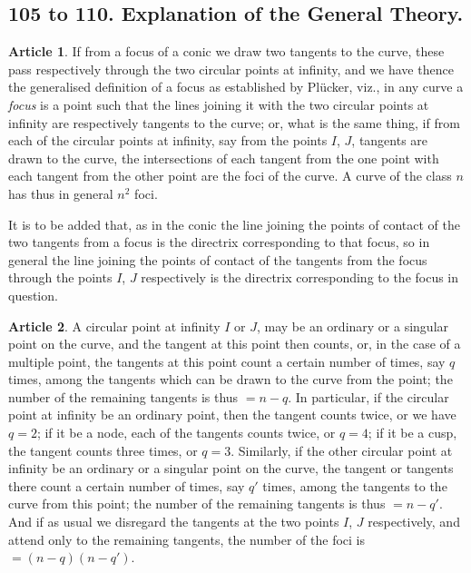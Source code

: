 \documentclass[11pt,a4paper]{article}
\theoremstyle{definition}
\newtheorem{art}{Article}
\begin{document}
\subsection*{105 to 110. Explanation of the General Theory.}

\begin{art}
If from a focus of a conic we draw two tangents to the curve, these pass respectively through the two circular points at infinity, and we have thence the generalised definition of a focus as established by Pl\"ucker, viz., in any curve a \textit{focus} is a point such that the lines joining it with the two circular points at infinity are respectively tangents to the curve; or, what is the same thing, if from each of the circular points at infinity, say from the points $I$, $J$, tangents are drawn to the curve, the intersections of each tangent from the one point with each tangent from the other point are the foci of the curve. A curve of the class $n$ has thus in general $n^{2}$ foci.

It is to be added that, as in the conic the line joining the points of contact of the two tangents from a focus is the directrix corresponding to that focus, so in general the line joining the points of contact of the tangents from the focus through the points $I$, $J$ respectively is the directrix corresponding to the focus in question.
\end{art}

\begin{art}
A circular point at infinity $I$ or $J$, may be an ordinary or a singular point on the curve, and the tangent at this point then counts, or, in the case of a multiple point, the tangents at this point count a certain number of times, say $q$ times, among the tangents which can be drawn to the curve from the point; the number of the remaining tangents is thus $= n - q$. In particular, if the circular point at infinity be an ordinary point, then the tangent counts twice, or we have $q = 2$; if it be a node, each of the tangents counts twice, or $q = 4$; if it be a cusp, the tangent counts three times, or $q = 3$. Similarly, if the other circular point at infinity be an ordinary or a singular point on the curve, the tangent or tangents there count a certain number of times, say $q'$ times, among the tangents to the curve from this point; the number of the remaining tangents is thus $= n - q'$. And if as usual we disregard the tangents at the two points $I$, $J$ respectively, and attend only to the remaining tangents, the number of the foci is $= (n - q)(n - q')$.
\end{art}
\end{document}

